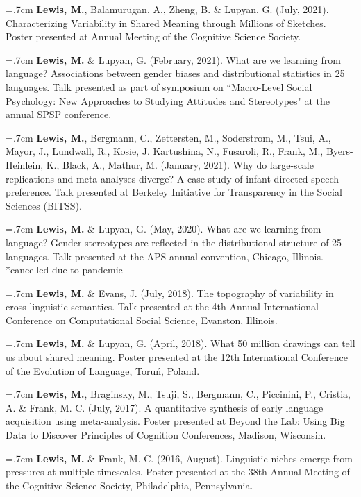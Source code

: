 \documentclass[letterpaper]{article}
\begin{document}
      \hangindent=.7cm {\bf Lewis, M.},  Balamurugan, A., Zheng, B. \& Lupyan, G. (July, 2021). Characterizing Variability in Shared Meaning through Millions of Sketches.  Poster presented at  Annual Meeting of the Cognitive Science Society.
      

 \hangindent=.7cm {\bf Lewis, M.} \& Lupyan, G. (February, 2021). What are we learning from language? Associations between gender biases and distributional statistics in 25 languages.  Talk presented as part of symposium on ``Macro-Level Social Psychology: New Approaches to Studying Attitudes and Stereotypes" at the annual SPSP conference. 

 \hangindent=.7cm {\bf Lewis, M.}, Bergmann, C., Zettersten, M., Soderstrom, M., Tsui, A., Mayor, J., Lundwall, R., Kosie, J. Kartushina, N., Fusaroli, R., Frank, M., Byers-Heinlein, K., Black, A., Mathur, M. (January, 2021). Why do large-scale replications and meta-analyses diverge? A case study of infant-directed speech preference. Talk presented at Berkeley Initiative for Transparency in the Social Sciences (BITSS). 

 \hangindent=.7cm {\bf Lewis, M.} \& Lupyan, G. (May, 2020). What are we learning from language? Gender stereotypes are reflected in the distributional structure of 25 languages. Talk presented at the APS annual convention, Chicago, Illinois. *cancelled due to pandemic


 \hangindent=.7cm {\bf Lewis, M.} \& Evans, J. (July, 2018). The topography of variability in cross-linguistic semantics. Talk presented at the 4th Annual International Conference on Computational Social Science, Evanston, Illinois.

 \hangindent=.7cm {\bf Lewis, M.} \& Lupyan, G. (April, 2018). What 50 million drawings can tell us about shared meaning. Poster presented at the 12th International Conference of the Evolution of Language, Toru\'{n}, Poland.

 \hangindent=.7cm {\bf Lewis, M.}, Braginsky, M., Tsuji, S., Bergmann, C., Piccinini, P., Cristia, A. \& Frank, M. C. (July, 2017). A quantitative synthesis of early language acquisition using meta-analysis. Poster presented at Beyond the Lab: Using Big Data to Discover Principles of Cognition Conferences, Madison, Wisconsin.

\hangindent=.7cm {\bf Lewis, M.} \& Frank, M. C. (2016, August).  Linguistic niches emerge from pressures at multiple timescales. Poster presented at the 38th Annual Meeting of the Cognitive Science Society, Philadelphia, Pennsylvania.
\end{document}
